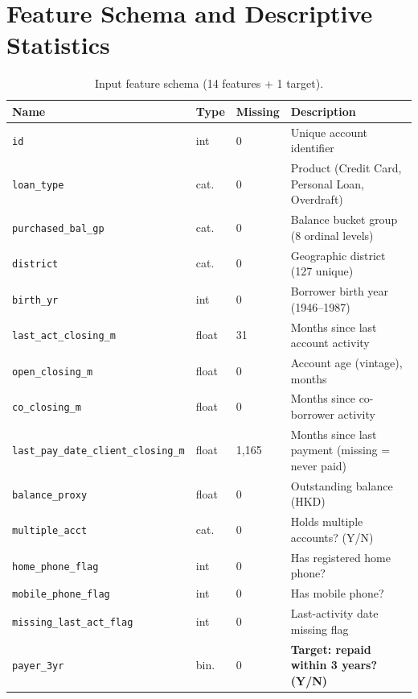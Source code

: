 \documentclass[11pt, a4paper]{article}
\begin{document}
\newpage
\appendix
\renewcommand{\thetable}{A\arabic{table}}
\renewcommand{\thefigure}{A\arabic{figure}}
\setcounter{table}{0}
\setcounter{figure}{0}

\section{Feature Schema and Descriptive Statistics}\label{app:schema}

\begin{table}[H]
\centering
\caption{Input feature schema (14 features + 1 target).}\label{tab:schema}
\small
\setlength{\tabcolsep}{5pt}
\begin{tabular}{@{}lllp{6.0cm}@{}}
\toprule
\textbf{Name} & \textbf{Type} & \textbf{Missing} & \textbf{Description}\\
\midrule
\texttt{id}                                 & int   & 0    & Unique account identifier\\
\texttt{loan\_type}                          & cat.  & 0    & Product (Credit Card, Personal Loan, Overdraft)\\
\texttt{purchased\_bal\_gp}                   & cat.  & 0    & Balance bucket group (8 ordinal levels)\\
\texttt{district}                            & cat.  & 0    & Geographic district (127 unique)\\
\texttt{birth\_yr}                            & int   & 0    & Borrower birth year (1946--1987)\\
\texttt{last\_act\_closing\_m}                  & float & 31   & Months since last account activity\\
\texttt{open\_closing\_m}                     & float & 0    & Account age (vintage), months\\
\texttt{co\_closing\_m}                       & float & 0    & Months since co-borrower activity\\
\texttt{last\_pay\_date\_client\_closing\_m}      & float & 1{,}165 & Months since last payment (missing = never paid)\\
\texttt{balance\_proxy}                       & float & 0    & Outstanding balance (HKD)\\
\texttt{multiple\_acct}                       & cat.  & 0    & Holds multiple accounts? (Y/N)\\
\texttt{home\_phone\_flag}                    & int   & 0    & Has registered home phone?\\
\texttt{mobile\_phone\_flag}                  & int   & 0    & Has mobile phone?\\
\texttt{missing\_last\_act\_flag}               & int   & 0    & Last-activity date missing flag\\
\midrule
\texttt{payer\_3yr}                           & bin.  & 0    & \textbf{Target: repaid within 3 years? (Y/N)}\\
\bottomrule
\end{tabular}
\end{table}
\end{document}
